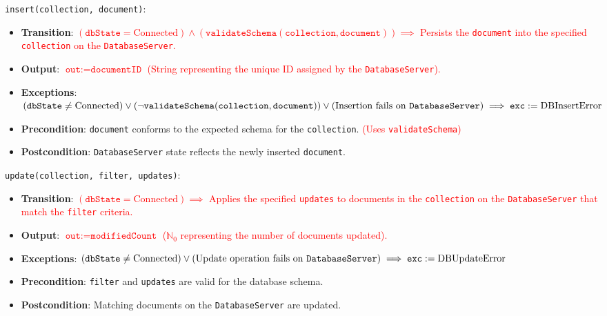 \documentclass[12pt, titlepage]{article}
\begin{document}
\noindent \texttt{insert(collection, document)}:
\begin{itemize}
    \item \textbf{Transition}: \textcolor{red}{$(\texttt{dbState} = \text{Connected}) \land (\texttt{validateSchema}(\texttt{collection}, \texttt{document})) \implies$ Persists the \texttt{document} into the specified \texttt{collection} on the \texttt{DatabaseServer}.}
    \item \textbf{Output}: \textcolor{red}{$\texttt{out} := \texttt{documentID}$ (String representing the unique ID assigned by the \texttt{DatabaseServer}).}
    \item \textbf{Exceptions}: \textcolor{red}{$(\texttt{dbState} \neq \text{Connected}) \lor (\neg \texttt{validateSchema}(\texttt{collection}, \texttt{document})) \lor (\text{Insertion fails on \texttt{DatabaseServer}}) \implies \texttt{exc} := \text{DBInsertError}$}
    \item \textbf{Precondition}: \texttt{document} conforms to the expected schema for the \texttt{collection}. \textcolor{red}{(Uses \texttt{validateSchema})}
    \item \textbf{Postcondition}: \texttt{DatabaseServer} state reflects the newly inserted \texttt{document}.
\end{itemize}

\noindent \texttt{update(collection, filter, updates)}:
\begin{itemize}
    \item \textbf{Transition}: \textcolor{red}{$(\texttt{dbState} = \text{Connected}) \implies$ Applies the specified \texttt{updates} to documents in the \texttt{collection} on the \texttt{DatabaseServer} that match the \texttt{filter} criteria.}
    \item \textbf{Output}: \textcolor{red}{$\texttt{out} := \texttt{modifiedCount}$ ($\mathbb{N}_0$ representing the number of documents updated).}
    \item \textbf{Exceptions}: \textcolor{red}{$(\texttt{dbState} \neq \text{Connected}) \lor (\text{Update operation fails on \texttt{DatabaseServer}}) \implies \texttt{exc} := \text{DBUpdateError}$}
    \item \textbf{Precondition}: \texttt{filter} and \texttt{updates} are valid for the database schema.
    \item \textbf{Postcondition}: Matching documents on the \texttt{DatabaseServer} are updated.
\end{itemize}
\end{document}
